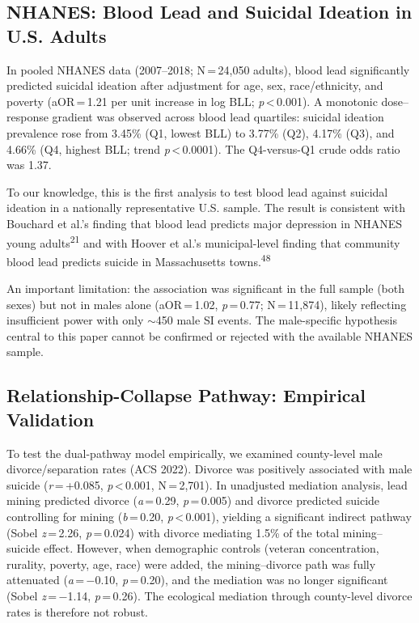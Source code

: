\documentclass[11pt,twocolumn]{article}
\begin{document}
\subsection{NHANES: Blood Lead and Suicidal Ideation in U.S. Adults}

In pooled NHANES data (2007--2018; N\,=\,24,050 adults), blood lead significantly predicted suicidal ideation after adjustment for age, sex, race/ethnicity, and poverty (aOR\,=\,1.21 per unit increase in log BLL; \textit{p}\,<\,0.001). A monotonic dose--response gradient was observed across blood lead quartiles: suicidal ideation prevalence rose from 3.45\% (Q1, lowest BLL) to 3.77\% (Q2), 4.17\% (Q3), and 4.66\% (Q4, highest BLL; trend \textit{p}\,<\,0.0001). The Q4-versus-Q1 crude odds ratio was 1.37.

To our knowledge, this is the first analysis to test blood lead against suicidal ideation in a nationally representative U.S. sample. The result is consistent with Bouchard et al.'s finding that blood lead predicts major depression in NHANES young adults\textsuperscript{21} and with Hoover et al.'s municipal-level finding that community blood lead predicts suicide in Massachusetts towns.\textsuperscript{48}

An important limitation: the association was significant in the full sample (both sexes) but not in males alone (aOR\,=\,1.02, \textit{p}\,=\,0.77; N\,=\,11,874), likely reflecting insufficient power with only $\sim$450 male SI events. The male-specific hypothesis central to this paper cannot be confirmed or rejected with the available NHANES sample.

\subsection{Relationship-Collapse Pathway: Empirical Validation}

To test the dual-pathway model empirically, we examined county-level male divorce/separation rates (ACS 2022). Divorce was positively associated with male suicide (\textit{r}\,=\,+0.085, \textit{p}\,<\,0.001, N\,=\,2,701). In unadjusted mediation analysis, lead mining predicted divorce (\textit{a}\,=\,0.29, \textit{p}\,=\,0.005) and divorce predicted suicide controlling for mining (\textit{b}\,=\,0.20, \textit{p}\,<\,0.001), yielding a significant indirect pathway (Sobel \textit{z}\,=\,2.26, \textit{p}\,=\,0.024) with divorce mediating 1.5\% of the total mining--suicide effect. However, when demographic controls (veteran concentration, rurality, poverty, age, race) were added, the mining--divorce path was fully attenuated (\textit{a}\,=\,$-$0.10, \textit{p}\,=\,0.20), and the mediation was no longer significant (Sobel \textit{z}\,=\,$-$1.14, \textit{p}\,=\,0.26). The ecological mediation through county-level divorce rates is therefore not robust.
\end{document}
